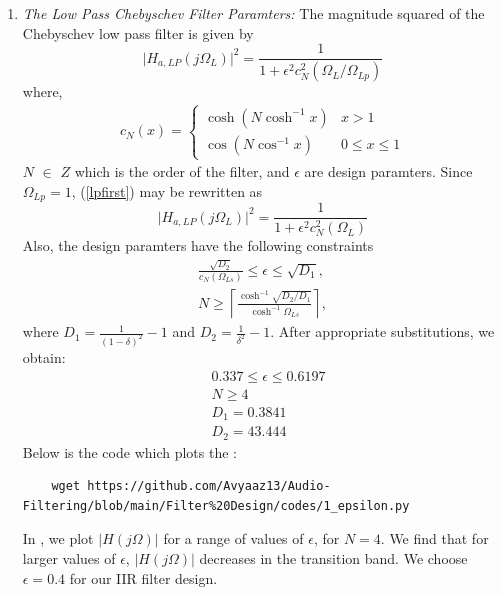 \documentclass[article]{IEEEtran}
\theoremstyle{remark}
\numberwithin{equation}{subsection}
\begin{document}
\begin{enumerate}
\item {\em The Low Pass Chebyschev Filter Paramters:}  The magnitude squared of the Chebyschev low pass filter is given by 
\begin{equation}
\label{lpfirst}
\vert H_{a,LP}(j\Omega_L)\vert^2 = \frac{1}{1 + \epsilon^2c_N^2(\Omega_L/\Omega_{Lp})}
\end{equation}
where,
\begin{align}
c_N(x) =
    \begin{cases}
   \cosh(N \cosh^{-1}x) & x > 1 \nonumber \\
   \cos(N \cos^{-1}x) & 0 \leq x \leq 1 
    \end{cases}
\end{align} $N$ $\in$ $Z$ which is the order of the filter, and $\epsilon$ are design paramters.  Since $\Omega_{Lp} = 1$, (\ref{lpfirst}) may be rewritten as
\begin{equation}
\label{lpsecond}
\vert H_{a,LP}(j\Omega_L)\vert^2 = \frac{1}{1 + \epsilon^2c_N^2(\Omega_L)}
\end{equation}
Also, the design paramters have the following constraints
\begin{eqnarray}
\label{lpdesign}
\frac{\sqrt{D_2}}{c_N(\Omega_{Ls})} \leq \epsilon \leq \sqrt{D_1}, \nonumber \\
N \geq \left\lceil \frac{\cosh^{-1}\sqrt{D_2/D_1}}{\cosh^{-1}\Omega_{Ls}} \right\rceil,
\end{eqnarray}
where $D_1 = \frac{1}{(1 - \delta)^2}-1$ and $D_2 = \frac{1}{\delta^2} - 1$.  After appropriate substitutions,
we obtain:
\begin{align}
    &0.337 \leq \epsilon \leq 0.6197\\
    &N \geq 4 \\
    &D_1 = 0.3841\\
    &D_2 = 43.444
\end{align}
Below is the code which plots the :
\begin{lstlisting}
    wget https://github.com/Avyaaz13/Audio-Filtering/blob/main/Filter%20Design/codes/1_epsilon.py
\end{lstlisting}
  In , we plot $\vert H(j\Omega)\vert$ for a range of values of $\epsilon$, for $N = 4$. We find that for larger values of $\epsilon$, $|H(j\Omega)|$ decreases in the transition band.  We choose $\epsilon = 0.4$  for our IIR filter design.  
\begin{figure}[!ht]
\centering

\end{figure}
\end{enumerate}
\end{document}
